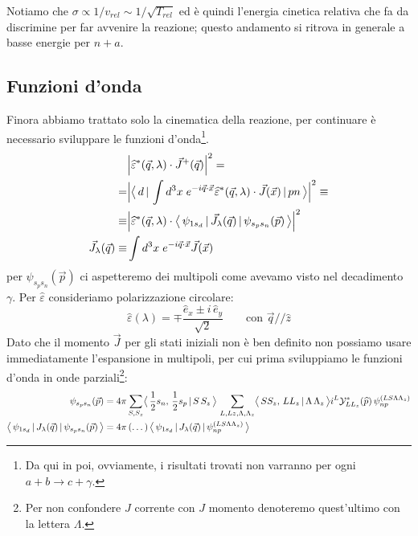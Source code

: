 Notiamo che $\sigma \propto 1/v_{rel} \sim 1/\sqrt{T_{rel}}$ ed è quindi l'energia cinetica relativa che fa da discrimine per far avvenire la reazione; questo andamento si ritrova in generale a basse energie per $n+a$.

\subsection{Funzioni d'onda} 
Finora abbiamo trattato solo la cinematica della reazione, per continuare è necessario sviluppare le funzioni d'onda\footnote{Da qui in poi, ovviamente, i risultati trovati non varranno per ogni $a+b\to c +\gamma$.}.
\begin{displaymath}
\begin{aligned}
&\Bigl|\widehat{\varepsilon}^*(\vec{q},\lambda) \cdot \vec{J}^+(\vec{q})\Bigr|^2 = \\
=& \Bigl|\bigl\langle\, d\, |\,\int d^3x \; e^{-i\vec{q}\cdot\vec{x}}\widehat{\varepsilon}^*(\vec{q},\lambda) \cdot \vec{J}(\vec{x})\, |\,pn\, \bigr\rangle\Bigr|^2 \equiv\\
\equiv& \Bigl | \widehat{\varepsilon}^*(\vec{q},\lambda) \cdot \bigl\langle\, \psi_{1s_d}\, |\,\vec{J}_\lambda(\vec{q})\, |\,\psi_{s_p s_n}(\vec{p})\, \bigr\rangle \Bigr |^2 \\
\vec{J}_\lambda(\vec{q}) \equiv&\int d^3x \; e^{-i\vec{q}\cdot\vec{x}}\vec{J}(\vec{x})
\end{aligned}
\end{displaymath}
per $\psi_{s_p s_n}(\vec{p})$ ci aspetteremo dei multipoli come avevamo visto nel decadimento $\gamma$. Per $\widehat{\varepsilon}$ consideriamo polarizzazione circolare:
$$\widehat{\varepsilon}(\lambda) = \mp \frac{\widehat{e}_x \pm i\,\widehat{e}_y}{\sqrt{2}}\qquad \text{con } \vec{q} // \hat{z} $$
Dato che il momento $\vec{J}$ per gli stati iniziali non è ben definito non possiamo usare immediatamente l'espansione in multipoli, per cui prima sviluppiamo le funzioni d'onda in onde parziali\footnote{Per non confondere $J$ corrente con $J$ momento denoteremo quest'ultimo con la lettera $\Lambda$.}:
\begin{displaymath}
\begin{aligned}
\psi_{s_ps_n}(\vec{p}) &= 4\pi \sum_{S,S_z} \clebs{\frac{1}{2}s_n,\,\frac{1}{2}s_p}{S\,S_z}\, \sum_{L,Lz,\Lambda,\Lambda_z} \clebs{SS_z,\,LL_z}{\Lambda\,\Lambda_z} i^L \mathcal{Y}^*_{LL_z}(\widehat{p}) \, \psi_{np}^{(LS\Lambda\Lambda_z)} \\
%
\oss{\psi_{1s_d}}{J_\lambda(\vec{q})}{\psi_{s_p s_n}(\vec{p})} &= 4\pi \,(\dots)\, \oss{\psi_{1s_d}}{J_\lambda(\vec{q})}{\psi_{np}^{(LS\Lambda\Lambda_z)}}
\end{aligned}
\end{displaymath}
